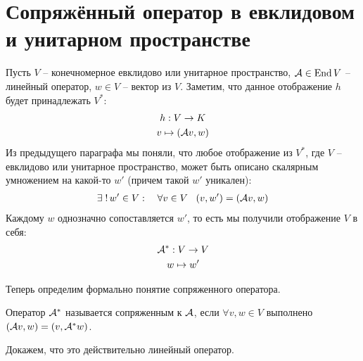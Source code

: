 \section{Сопряжённый оператор в евклидовом и унитарном пространстве}
Пусть $V$ -- конечномерное евклидово или унитарное пространство, $\mathcal{A} \in \operatorname{End} V$ -- линейный оператор, $w \in V$ -- вектор из $V$.
Заметим, что данное отображение $h$ будет принадлежать $V^*$: \begin{gather*}
    h: V \to K \\
    v \mapsto (\mathcal{A} v, w)
\end{gather*}
Из предыдущего параграфа мы поняли, что любое отображение из $V^*$, где $V$ -- евклидово или унитарное пространство, может быть описано скалярным умножением на какой-то $w'$ (причем такой $w'$ уникален): \begin{gather*}
    \exists \; ! \, w' \in V : \quad \forall v \in V \;\;\; (v, w') = (\mathcal{A} v, w)
\end{gather*} 
Каждому $w$ однозначно сопоставляется $w'$, то есть мы получили отображение $V$ в себя: \begin{gather*}
    \mathcal{A}^*: V \to V \\
    w \mapsto w'
\end{gather*}

Теперь определим формально понятие сопряженного оператора.
\begin{conj}
    Оператор $\mathcal{A}^*$ называется сопряженным к $\mathcal{A}$, если $\forall v, w \in V$ выполнено $(\mathcal{A} v, w) = (v, \mathcal{A}^*w)$.
\end{conj}

\vspace*{5mm}

Докажем, что это действительно линейный оператор.

